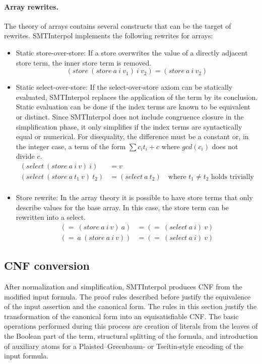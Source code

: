 \documentclass[a4paper]{article}
\newcommand\si{SMTInterpol\xspace}
\begin{document}
\paragraph{Array rewrites.}  The theory of arrays contains several constructs
that can be the target of rewrites.  \si implements the following rewrites for
arrays:
\begin{itemize}
\item Static store-over-store:  If a store overwrites the value of a directly
  adjacent store term, the inner store term is removed.
  \begin{equation}
    (store\ (store\ a\ i\ v_1)\ i\ v_2) = (store\ a\ i\ v_2)
    \tag{storeOverStore}
  \end{equation}
\item Static select-over-store: If the select-over-store axiom can be
  statically evaluated, \si replaces the application of the term by
  its conclusion.  Static evaluation can be done if the index terms
  are known to be equivalent or distinct.  Since \si does not include
  congruence closure in the simplification phase, it only simplifies
  if the index terms are syntactically equal or numerical.  For
  disequality, the difference must be a constant or, in the integer
  case, a term of the form $\sum c_it_i + c$ where $gcd(c_i)$ does not
  divide $c$.
  \begin{equation}
    \begin{aligned}
      (select\ (store\ a\ i\ v)\ i) &= v\\
      (select\ (store\ a\ t_1\ v)\ t_2) &= (select\ a\ t_2) \quad\text{where $t_1\neq t_2$ holds trivially}\\
    \end{aligned}\tag{selectOverStore}
  \end{equation}
\item Store rewrite:  In the array theory it is possible to have store terms
  that only describe values for the base array.  In this case, the store term
  can be rewritten into a select.
  \begin{equation}
    \begin{aligned}
      (=\ (store\ a\ i\ v)\ a) &= (=\ (select\ a\ i)\ v)\\
      (=\ a\ (store\ a\ i\ v)) &= (=\ (select\ a\ i)\ v)
    \end{aligned}\tag{storeRewrite}
  \end{equation}
\end{itemize}

\subsection{CNF conversion}
After normalization and simplification, \si produces CNF from the modified
input formula.  The proof rules described before justify the equivalence of
the input assertion and the canonical form.  The rules in this section justify
the transformation of the canonical form into an equisatisfiable CNF.  The
basic operations performed during this process are creation of literals from
the leaves of the Boolean part of the term, structural splitting of the
formula, and introduction of auxiliary atoms for a Plaisted--Greenbaum- or
Tseitin-style encoding of the input formula.
\end{document}
